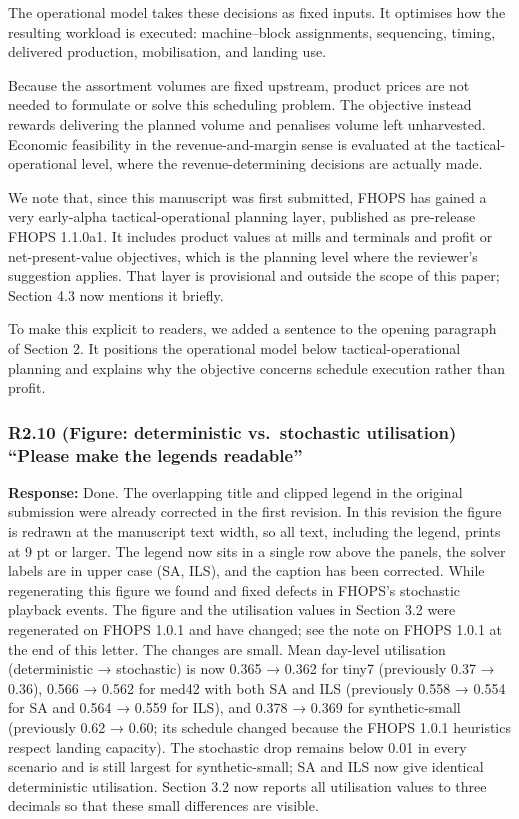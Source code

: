 The operational model takes these decisions as fixed inputs. It
optimises how the resulting workload is executed: machine--block
assignments, sequencing, timing, delivered production, mobilisation, and
landing use.

Because the assortment volumes are fixed upstream, product prices are
not needed to formulate or solve this scheduling problem. The objective
instead rewards delivering the planned volume and penalises volume left
unharvested. Economic feasibility in the revenue-and-margin sense is
evaluated at the tactical-operational level, where the
revenue-determining decisions are actually made.

We note that, since this manuscript was first submitted, FHOPS has
gained a very early-alpha tactical-operational planning layer, published
as pre-release FHOPS 1.1.0a1. It includes product values at mills and
terminals and profit or net-present-value objectives, which is the
planning level where the reviewer's suggestion applies. That layer is
provisional and outside the scope of this paper; Section 4.3 now
mentions it briefly.

To make this explicit to readers, we added a sentence to the opening
paragraph of Section 2. It positions the operational model below
tactical-operational planning and explains why the objective concerns
schedule execution rather than profit.

\subsubsection{R2.10 (Figure: deterministic vs.~stochastic utilisation)
``Please make the legends
readable''}\label{r2.10-figure-deterministic-vs.-stochastic-utilisation-please-make-the-legends-readable}

\textbf{Response:} Done. The overlapping title and clipped legend in the
original submission were already corrected in the first revision. In
this revision the figure is redrawn at the manuscript text width, so all
text, including the legend, prints at 9 pt or larger. The legend now
sits in a single row above the panels, the solver labels are in upper
case (SA, ILS), and the caption has been corrected. While regenerating
this figure we found and fixed defects in FHOPS's stochastic playback
events. The figure and the utilisation values in Section 3.2 were
regenerated on FHOPS 1.0.1 and have changed; see the note on FHOPS 1.0.1
at the end of this letter. The changes are small. Mean day-level
utilisation (deterministic → stochastic) is now 0.365 → 0.362 for tiny7
(previously 0.37 → 0.36), 0.566 → 0.562 for med42 with both SA and ILS
(previously 0.558 → 0.554 for SA and 0.564 → 0.559 for ILS), and 0.378 →
0.369 for synthetic-small (previously 0.62 → 0.60; its schedule changed
because the FHOPS 1.0.1 heuristics respect landing capacity). The
stochastic drop remains below 0.01 in every scenario and is still
largest for synthetic-small; SA and ILS now give identical deterministic
utilisation. Section 3.2 now reports all utilisation values to three
decimals so that these small differences are visible.

